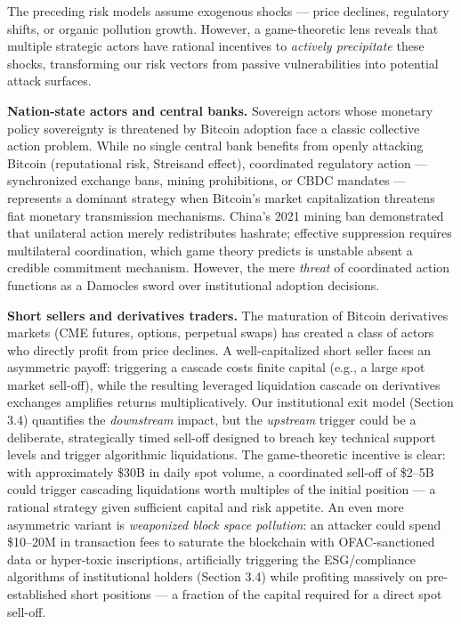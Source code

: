 \documentclass[
  11pt,
]{article}
\begin{document}
The preceding risk models assume exogenous shocks --- price declines,
regulatory shifts, or organic pollution growth. However, a
game-theoretic lens reveals that multiple strategic actors have rational
incentives to \emph{actively precipitate} these shocks, transforming our
risk vectors from passive vulnerabilities into potential attack
surfaces.

\textbf{Nation-state actors and central banks.} Sovereign actors whose
monetary policy sovereignty is threatened by Bitcoin adoption face a
classic collective action problem. While no single central bank benefits
from openly attacking Bitcoin (reputational risk, Streisand effect),
coordinated regulatory action --- synchronized exchange bans, mining
prohibitions, or CBDC mandates --- represents a dominant strategy when
Bitcoin's market capitalization threatens fiat monetary transmission
mechanisms. China's 2021 mining ban demonstrated that unilateral action
merely redistributes hashrate; effective suppression requires
multilateral coordination, which game theory predicts is unstable absent
a credible commitment mechanism. However, the mere \emph{threat} of
coordinated action functions as a Damocles sword over institutional
adoption decisions.

\textbf{Short sellers and derivatives traders.} The maturation of
Bitcoin derivatives markets (CME futures, options, perpetual swaps) has
created a class of actors who directly profit from price declines. A
well-capitalized short seller faces an asymmetric payoff: triggering a
cascade costs finite capital (e.g., a large spot market sell-off), while
the resulting leveraged liquidation cascade on derivatives exchanges
amplifies returns multiplicatively. Our institutional exit model
(Section 3.4) quantifies the \emph{downstream} impact, but the
\emph{upstream} trigger could be a deliberate, strategically timed
sell-off designed to breach key technical support levels and trigger
algorithmic liquidations. The game-theoretic incentive is clear: with
approximately \$30B in daily spot volume, a coordinated sell-off of
\$2--5B could trigger cascading liquidations worth multiples of the
initial position --- a rational strategy given sufficient capital and
risk appetite. An even more asymmetric variant is \emph{weaponized block
space pollution}: an attacker could spend \$10--20M in transaction fees
to saturate the blockchain with OFAC-sanctioned data or hyper-toxic
inscriptions, artificially triggering the ESG/compliance algorithms of
institutional holders (Section 3.4) while profiting massively on
pre-established short positions --- a fraction of the capital required
for a direct spot sell-off.
\end{document}
